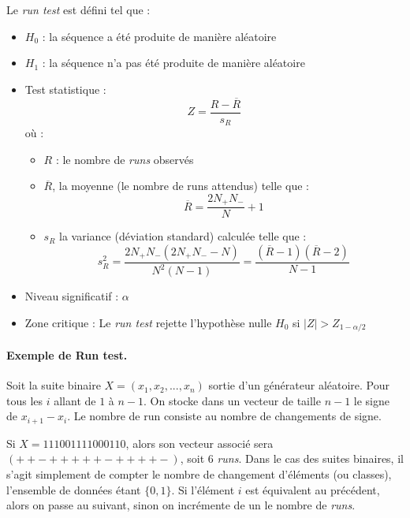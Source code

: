 Le \textit{run test} est défini tel que : 
\begin{itemize}
\item $H_0$ : la séquence a été produite de manière aléatoire
\item $H_1$ : la séquence n'a pas été produite de manière aléatoire
\item Test statistique : 
	$$ Z = \frac{R - \overline{R}}{s_R}$$
	où : 
	\begin{itemize}
	\item $R$ : le nombre de \textit{runs} observés
	\item $\overline{R}$, la moyenne (le nombre de runs attendus) telle que  :
	$$\overline{R}= \frac{2  N_+ N_-}{N}+1$$
	\item $s_R$ la variance (déviation standard) calculée telle que : 
	$$s_R^2 = \frac{2 N_+ N_-(2N_+ N_- -N)}{N^2(N-1)}  = \frac{(\overline{R}-1)(\overline{R}-2)}{N-1}$$
	\end{itemize}
\item Niveau significatif : $\alpha$
\item Zone critique : Le \textit{run test} rejette l'hypothèse nulle $H_0$  si $ |Z| > Z_{1-\alpha/2}$


\end{itemize}





\paragraph{Exemple de Run test.\\}
Soit la suite binaire $X=(x_1,x_2,...,x_n)$ sortie d'un générateur aléatoire. Pour tous les $i$ allant de $1$ à $n-1$. On stocke dans un vecteur de taille $n-1$ le signe de $x_{i+1}-x_i$. Le nombre de run consiste au nombre de changements de signe.

Si $X=111001111000110$, alors son vecteur associé sera $(++-+++++-++++-)$, soit 6 \textit{runs}. Dans le cas des suites binaires, il s'agit simplement de compter le nombre de changement d'éléments (ou classes), l'ensemble de données étant $\lbrace 0,1 \rbrace$. Si l'élément $i$ est équivalent au précédent, alors on passe au suivant, sinon on incrémente de un le nombre de \textit{runs}.\\

